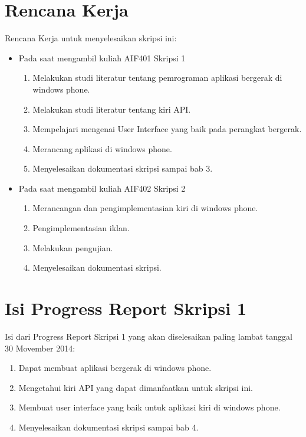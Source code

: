 \documentclass[a4paper,twoside]{article}
\begin{document}
\section{Rencana Kerja}
	Rencana Kerja untuk menyelesaikan skripsi ini:
	\begin{itemize}
		\item Pada saat mengambil kuliah AIF401 Skripsi 1
		\begin{enumerate}
			\item Melakukan studi literatur tentang pemrograman aplikasi bergerak di windows phone.
			\item Melakukan studi literatur tentang kiri API.
			\item Mempelajari mengenai User Interface yang baik pada perangkat bergerak.
			\item Merancang aplikasi di windows phone.
			\item Menyelesaikan dokumentasi skripsi sampai bab 3.
		\end{enumerate}
	\end{itemize}
	\begin{itemize}
		\item Pada saat mengambil kuliah AIF402 Skripsi 2
		\begin{enumerate}
			\item Merancangan dan pengimplementasian kiri di windows phone.
			\item Pengimplementasian iklan.
			\item Melakukan pengujian.
			\item Menyelesaikan dokumentasi skripsi.
		\end{enumerate}
	\end{itemize}
	
\section{Isi Progress Report Skripsi 1}
Isi dari Progress Report Skripsi 1 yang akan diselesaikan paling lambat tanggal 30 Movember 2014:
\begin{enumerate}
	\item Dapat membuat aplikasi bergerak di windows phone.
	\item Mengetahui kiri API yang dapat dimanfaatkan untuk skripsi ini.
	\item Membuat user interface yang baik untuk aplikasi kiri di windows phone.
	\item Menyelesaikan dokumentasi skripsi sampai bab 4.
\end{enumerate}	
\end{document}
